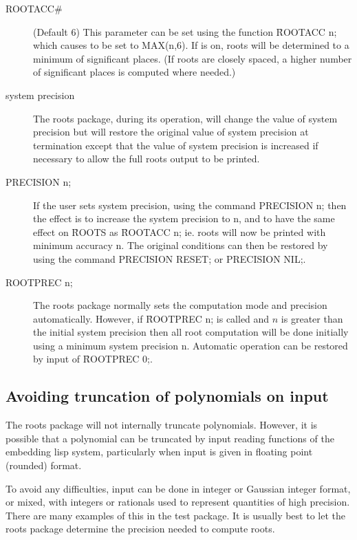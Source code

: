 \begin{description}
\item[ROOTACC\#] (Default 6) This parameter can be set using the function
\f{ROOTACC} n; which causes  to be set to MAX(n,6).  If 
is on, roots will be determined to a minimum of 
significant places. (If roots are closely spaced, a higher number of
significant places is computed where needed.)

\item[system precision] The roots package, during its operation, will
change the value of system precision but will restore the original value
of system precision at termination except that the value of system
precision is increased if necessary to allow the full roots output to be
printed.

\item[PRECISION n;] If the user sets system precision, using the command
PRECISION n; then the effect is to increase the system precision to n, and
to have the same effect on \f{ROOTS} as \f{ROOTACC} n; ie. roots will now be
printed with minimum accuracy n.  The original conditions can then be
restored by using the command PRECISION RESET; or PRECISION NIL;.

\item[ROOTPREC n;] The roots package normally sets the computation mode and
precision automatically.  However, if \f{ROOTPREC} n; is
called and $n$ is greater than the initial system precision then all root
computation will be done initially using a minimum system precision n.
Automatic operation can be restored by input of \f{ROOTPREC} 0;.
\end{description}


\subsection{Avoiding truncation of polynomials on input}

The roots package will not internally truncate polynomials.  However, it
is possible that a polynomial can be truncated by input reading functions
of the embedding lisp system, particularly when input is given in floating
point (rounded) format.

To avoid any difficulties, input can be done in integer or Gaussian
integer format, or mixed, with integers or rationals used to represent
quantities of high precision. There are many examples of this in the
test package.  It is usually best to let the roots package
determine the precision needed to compute roots.

